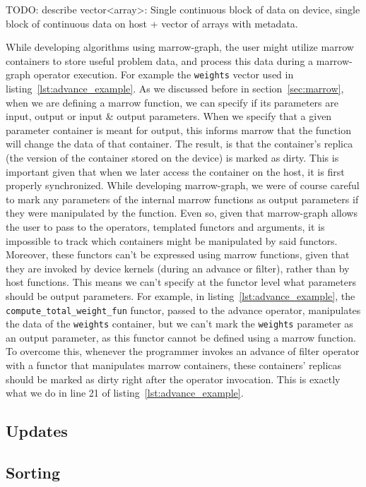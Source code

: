 TODO: describe vector<array>: Single continuous block of data on device, single block of continuous data on host + vector of arrays with metadata.

While developing algorithms using marrow-graph, the user might utilize marrow containers to store useful problem data, and process this data during a marrow-graph operator execution. For example the \texttt{weights} vector used in listing~\ref{lst:advance_example}. As we discussed before in section~\ref{sec:marrow}, when we are defining a marrow function, we can specify if its parameters are input, output or input \& output parameters. When we specify that a given parameter container is meant for output, this informs marrow that the function will change the data of that container. The result, is that the container's replica (the version of the container stored on the device) is marked as dirty. This is important given that when we later access the container on the host, it is first properly synchronized. While developing marrow-graph, we were of course careful to mark any parameters of the internal marrow functions as output parameters if they were manipulated by the function. Even so, given that marrow-graph allows the user to pass to the operators, templated functors and arguments, it is impossible to track which containers might be manipulated by said functors. Moreover, these functors can't be expressed using marrow functions, given that they are invoked by device kernels (during an advance or filter), rather than by host functions. This means we can't specify at the functor level what parameters should be output parameters. For example, in listing~\ref{lst:advance_example}, the \texttt{compute\_total\_weight\_fun} functor, passed to the advance operator, manipulates the data of the \texttt{weights} container, but we can't mark the \texttt{weights} parameter as an output parameter, as this functor cannot be defined using a marrow function. To overcome this, whenever the programmer invokes an advance of filter operator with a functor that manipulates marrow containers, these containers' replicas should be marked as dirty right after the operator invocation. This is exactly what we do in line 21 of listing~\ref{lst:advance_example}.

\subsection{Updates}



\subsection{Sorting}

